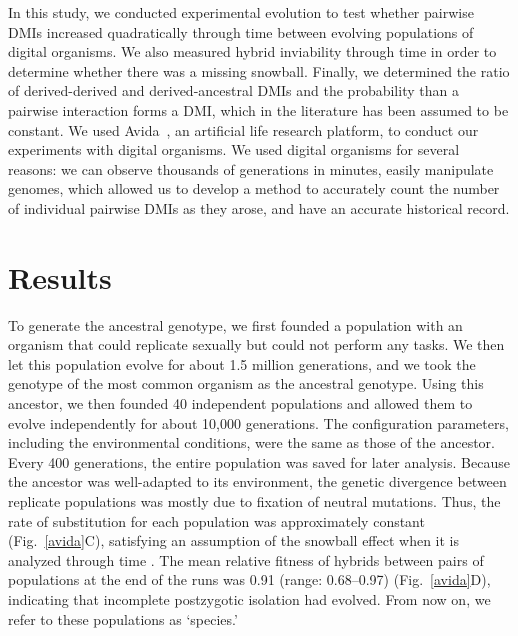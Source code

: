 \begin{doublespace}


In this study, we conducted experimental evolution
to test whether pairwise DMIs increased quadratically through time
between evolving populations of digital organisms.
%
We also measured hybrid inviability through time
in order to determine whether there was a missing snowball.
%
Finally, we determined the ratio of derived-derived and derived-ancestral DMIs
and the probability than a pairwise interaction forms a DMI,
which in the literature has been assumed to be constant.
%
We used Avida~\citep{ofr04}, an artificial life research platform,
to conduct our experiments with digital organisms.
%
We used digital organisms for several reasons:
we can observe thousands of generations in minutes,
easily manipulate genomes, which allowed us to
develop a method to accurately count the number of individual pairwise DMIs
as they arose,
and have an accurate historical record.







\section{Results}

To generate the ancestral genotype, we first founded a population
with an organism that could replicate sexually but could not perform any tasks.
%
We then let this population evolve for about 1.5 million generations,
and we took the genotype of the most common organism as the ancestral genotype.
%
Using this ancestor, we then founded 40 independent populations
and allowed them to evolve independently for about 10,000 generations.
%
The configuration parameters, including the environmental conditions,
were the same as those of the ancestor.
%
Every 400 generations, the entire population was saved for later analysis.
%
Because the ancestor was well-adapted to its environment,
the genetic divergence between replicate populations
was mostly due to fixation of neutral mutations.
%
Thus, the rate of substitution for each population
was approximately constant (Fig.~\ref{avida}C),
satisfying an assumption of the snowball effect
when it is analyzed through time \citep{orr95}.
%
The mean relative fitness of hybrids between pairs of populations
at the end of the runs was 0.91 (range: 0.68--0.97) (Fig.~\ref{avida}D),
indicating that incomplete postzygotic isolation had evolved.
%
From now on, we refer to these populations as `species.'




\end{doublespace}
